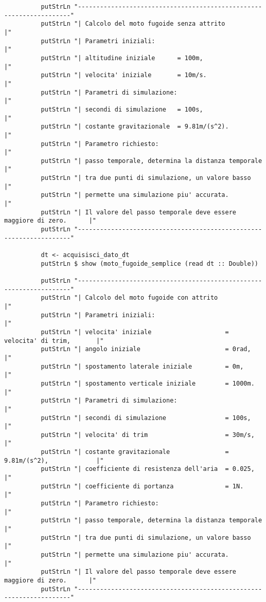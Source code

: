 \begin{verbatim}
          putStrLn "--------------------------------------------------------------------"
          putStrLn "| Calcolo del moto fugoide senza attrito                           |"
          putStrLn "| Parametri iniziali:                                              |"
          putStrLn "| altitudine iniziale      = 100m,                                 |"
          putStrLn "| velocita' iniziale       = 10m/s.                                |"
          putStrLn "| Parametri di simulazione:                                        |"
          putStrLn "| secondi di simulazione   = 100s,                                 |"
          putStrLn "| costante gravitazionale  = 9.81m/(s^2).                          |"
          putStrLn "| Parametro richiesto:                                             |"
          putStrLn "| passo temporale, determina la distanza temporale                 |"
          putStrLn "| tra due punti di simulazione, un valore basso                    |"
          putStrLn "| permette una simulazione piu' accurata.                          |"
          putStrLn "| Il valore del passo temporale deve essere maggiore di zero.      |"
          putStrLn "--------------------------------------------------------------------"

          dt <- acquisisci_dato_dt
          putStrLn $ show (moto_fugoide_semplice (read dt :: Double))

          putStrLn "--------------------------------------------------------------------"
          putStrLn "| Calcolo del moto fugoide con attrito                             |"
          putStrLn "| Parametri iniziali:                                              |"
          putStrLn "| velocita' iniziale                    = velocita' di trim,       |"
          putStrLn "| angolo iniziale                       = 0rad,                    |"
          putStrLn "| spostamento laterale iniziale         = 0m,                      |"
          putStrLn "| spostamento verticale iniziale        = 1000m.                   |"
          putStrLn "| Parametri di simulazione:                                        |"
          putStrLn "| secondi di simulazione                = 100s,                    |"
          putStrLn "| velocita' di trim                     = 30m/s,                   |"
          putStrLn "| costante gravitazionale               = 9.81m/(s^2),             |"
          putStrLn "| coefficiente di resistenza dell'aria  = 0.025,                   |"
          putStrLn "| coefficiente di portanza              = 1N.                      |"
          putStrLn "| Parametro richiesto:                                             |"
          putStrLn "| passo temporale, determina la distanza temporale                 |"
          putStrLn "| tra due punti di simulazione, un valore basso                    |"
          putStrLn "| permette una simulazione piu' accurata.                          |"
          putStrLn "| Il valore del passo temporale deve essere maggiore di zero.      |"
          putStrLn "--------------------------------------------------------------------"


\end{verbatim}
